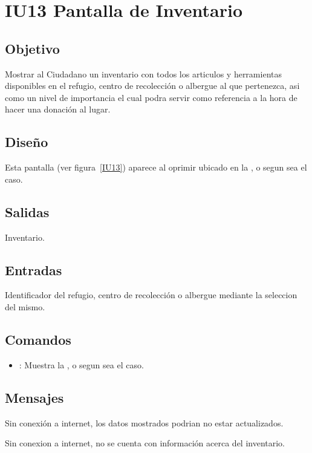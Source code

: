 \section{IU13 Pantalla de Inventario}

\subsection{Objetivo}
	Mostrar al Ciudadano un inventario con todos los articulos y herramientas disponibles en el refugio, centro de recolección o albergue al que pertenezca, asi como un nivel de importancia el cual podra servir como referencia a la hora de hacer una donación al lugar.

\subsection{Diseño}
	Esta pantalla  (ver figura~\ref{IU13}) aparece al oprimir  ubicado en la ,  o  segun sea el caso.
	

\subsection{Salidas}

	Inventario.

\subsection{Entradas}
	Identificador del refugio, centro de recolección o albergue mediante la seleccion del mismo.

\subsection{Comandos}
\begin{itemize}
	\item {}: Muestra la ,  o  segun sea el caso.
\end{itemize}

\subsection{Mensajes}

\begin{Citemize}
	\item Sin conexión a internet, los datos mostrados podrian no estar actualizados.
	\item Sin conexion a internet, no se cuenta con información acerca del inventario.
\end{Citemize}

\clearpage